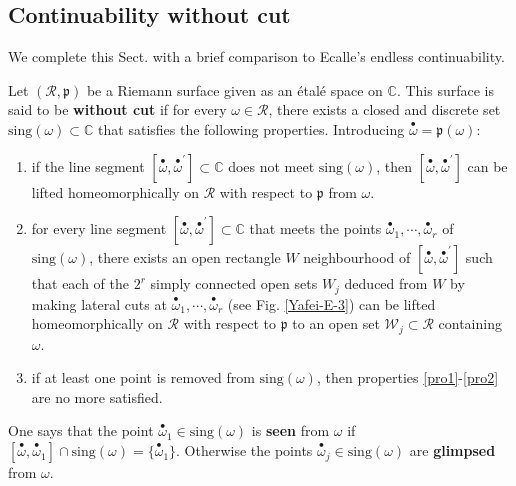 \documentclass[11pt, english]{smfart}
\theoremstyle{definition}
\begin{document}
\subsection{Continuability without cut}

We complete this Sect. with a brief comparison to  Ecalle's endless
continuability.  

\begin{defi}\label{defendcut}
Let $(\mathscr{R}, \mathfrak{p})$ be
a Riemann surface  given as an \'etal\'e space on
$\mathbb{C}$. This surface is said to be \textbf{without cut} if for every $\omega \in
\mathscr{R}$,  there exists a closed and
discrete set $\mathrm{sing} (\omega) \subset \mathbb{C}$ that
satisfies the following properties. Introducing ${ {\stackrel{\bullet}{\omega}} } = \mathfrak{p} (\omega)$: 
\begin{enumerate}
\item \label{pro1} 
if the line segment $[{ {\stackrel{\bullet}{\omega}} }, { {\stackrel{\bullet}{\omega}} }^\prime] \subset \mathbb{C}$ does
not meet $\mathrm{sing}(\omega)$, then $[{ {\stackrel{\bullet}{\omega}} }, { {\stackrel{\bullet}{\omega}} }^\prime]$ can be
lifted   homeomorphically on $\mathscr{R}$ with respect to $\mathfrak{p}$ from $\omega$.
\item \label{pro2} for every line segment $[{ {\stackrel{\bullet}{\omega}} }, { {\stackrel{\bullet}{\omega}} }^\prime] \subset \mathbb{C}$ that
  meets the points ${ {\stackrel{\bullet}{\omega}} }_1, \cdots, { {\stackrel{\bullet}{\omega}} }_r$ of
  $\mathrm{sing}(\omega)$,  there exists an open rectangle $W$ neighbourhood of
  $[{ {\stackrel{\bullet}{\omega}} }, { {\stackrel{\bullet}{\omega}} }^\prime]$ such that each of the
  $2^r$ simply connected open sets $W_j$ deduced from $W$ by making lateral cuts at ${ {\stackrel{\bullet}{\omega}} }_1,
  \cdots, { {\stackrel{\bullet}{\omega}} }_r$ (see Fig. \ref{Yafei-E-3}) can be lifted
  homeomorphically on $\mathscr{R}$ with respect to $\mathfrak{p}$ to an open set $ \mathcal{W}_j
  \subset \mathscr{R}$ containing $\omega$.
\item \label{condcut3} if at least one point is removed from $\mathrm{sing}(\omega)$,
  then properties \ref{pro1}-\ref{pro2} are no more satisfied.
\end{enumerate}
One says that the  point ${ {\stackrel{\bullet}{\omega}} }_1 \in
\mathrm{sing}(\omega)$  is \textbf{seen} from $\omega$ if
${[{ {\stackrel{\bullet}{\omega}} }, { {\stackrel{\bullet}{\omega}} }_1] \cap \mathrm{sing}(\omega) = \{{ {\stackrel{\bullet}{\omega}} }_1\}}$.
Otherwise the  points ${ {\stackrel{\bullet}{\omega}} }_j \in \mathrm{sing}(\omega)$ 
are \textbf{glimpsed} from $\omega$.
\end{defi}
\end{document}
